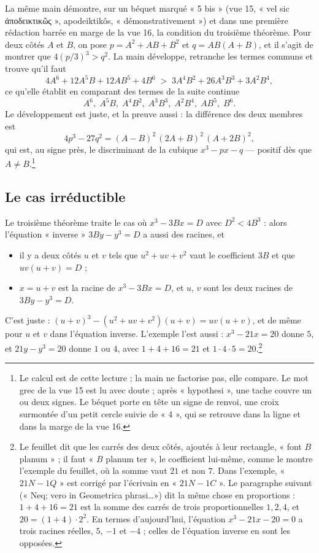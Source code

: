 \documentclass[11pt,a4paper]{article}
\begin{document}
La même main démontre, sur un béquet marqué « 5 bis » (vue 15, « vel sic
ἀποδεικτικῶς », apodeiktikôs, « démonstrativement ») et dans une première rédaction barrée en marge de la vue 16, la
condition du troisième théorème. Pour deux côtés $A$ et $B$, on pose
$p = A^2 + AB + B^2$ et $q = AB(A + B)$, et il s'agit de montrer que
$4(p/3)^3 > q^2$. La main développe, retranche les termes communs et trouve
qu'il faut
\[ 4A^6 + 12A^5B + 12AB^5 + 4B^6 \;>\; 3A^4B^2 + 26A^3B^3 + 3A^2B^4 , \]
ce qu'elle établit en comparant des termes de la suite continue
\[ A^6,\; A^5B,\; A^4B^2,\; A^3B^3,\; A^2B^4,\; AB^5,\; B^6 . \] Le développement est juste, et la
preuve aussi : la différence des deux membres est
\[ 4p^3 - 27q^2 = (A - B)^2\,(2A + B)^2\,(A + 2B)^2 , \]
qui est, au signe près, le discriminant de la cubique $x^3 - px - q$ — positif
dès que $A \ne B$.\footnote{Le calcul est de cette lecture ; la main ne factorise
pas, elle compare. Le mot grec de la vue 15 est lu avec doute ; après
« hypothesi », une tache couvre un ou deux signes. Le béquet porte en tête un
signe de renvoi, une croix surmontée d'un petit cercle suivie de « 4 », qui se
retrouve dans la ligne et dans la marge de la vue 16.}

\subsection*{Le cas irréductible}

Le troisième théorème traite le cas où $x^3 - 3Bx = D$ avec $D^2 < 4B^3$ :
alors l'équation « inverse » $3By - y^3 = D$ a aussi des racines, et
\begin{itemize}
  \item il y a deux côtés $u$ et $v$ tels que $u^2 + uv + v^2$ vaut le
    coefficient $3B$ et que $uv(u + v) = D$ ;
  \item $x = u + v$ est la racine de $x^3 - 3Bx = D$, et $u$, $v$ sont les deux
    racines de $3By - y^3 = D$.
\end{itemize}
C'est juste : $(u+v)^3 - (u^2+uv+v^2)(u+v) = uv(u+v)$, et de même pour $u$ et
$v$ dans l'équation inverse. L'exemple l'est aussi : $x^3 - 21x = 20$ donne
$5$, et $21y - y^3 = 20$ donne $1$ ou $4$, avec $1 + 4 + 16 = 21$ et
$1 \cdot 4 \cdot 5 = 20$.\footnote{Le feuillet dit que les carrés des deux côtés,
ajoutés à leur rectangle, « font $B$ planum » ; il faut « $B$ planum ter », le
coefficient lui-même, comme le montre l'exemple du feuillet, où la somme vaut
$21$ et non $7$. Dans l'exemple, « $21N - 1Q$ » est corrigé par l'écrivain en
« $21N - 1C$ ». Le paragraphe suivant (« Neq; vero in Geometrica phrasi\ldots ») dit
la même chose en proportions : $1 + 4 + 16 = 21$ est la somme des carrés de
trois proportionnelles $1, 2, 4$, et $20 = (1 + 4) \cdot 2^2$. En termes
d'aujourd'hui, l'équation $x^3 - 21x - 20 = 0$ a trois racines réelles, $5$,
$-1$ et $-4$ ; celles de l'équation inverse en sont les opposées.}
\end{document}
